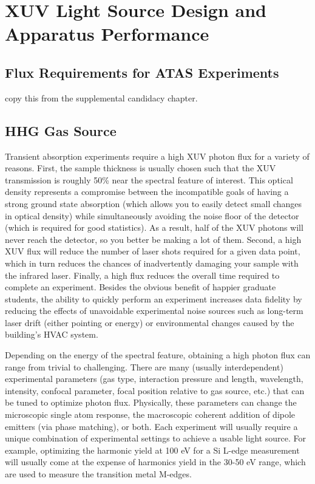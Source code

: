 \chapter{XUV Light Source Design and Apparatus Performance}

\section{Flux Requirements for ATAS Experiments}

copy this from the supplemental candidacy chapter.

\section{HHG Gas Source}

Transient absorption experiments require a high XUV photon flux for a variety of reasons. First, the sample thickness is usually chosen such that the XUV transmission is roughly 50\% near the spectral feature of interest. This optical density represents a compromise between the incompatible goals of having a strong ground state absorption (which allows you to easily detect small changes in optical density) while simultaneously avoiding the noise floor of the detector (which is required for good statistics). As a result, half of the XUV photons will never reach the detector, so you better be making a lot of them. Second, a high XUV flux will reduce the number of laser shots required for a given data point, which in turn reduces the chances of inadvertently damaging your sample with the infrared laser. Finally, a high flux reduces the overall time required to complete an experiment. Besides the obvious benefit of happier graduate students, the ability to quickly perform an experiment increases data fidelity by reducing the effects of unavoidable experimental noise sources such as long-term laser drift (either pointing or energy) or environmental changes caused by the building's HVAC system.

Depending on the energy of the spectral feature, obtaining a high photon flux can range from trivial to challenging. There are many (usually interdependent) experimental parameters (gas type, interaction pressure and length, wavelength, intensity, confocal parameter, focal position relative to gas source, etc.) that can be tuned to optimize photon flux. Physically, these parameters can change the microscopic single atom response, the macroscopic coherent addition of dipole emitters (via phase matching), or both. Each experiment will usually require a unique combination of experimental settings to achieve a usable light source. For example, optimizing the harmonic yield at 100 eV for a Si L-edge measurement will usually come at the expense of harmonics yield in the 30-50 eV range, which are used to measure the transition metal M-edges.

